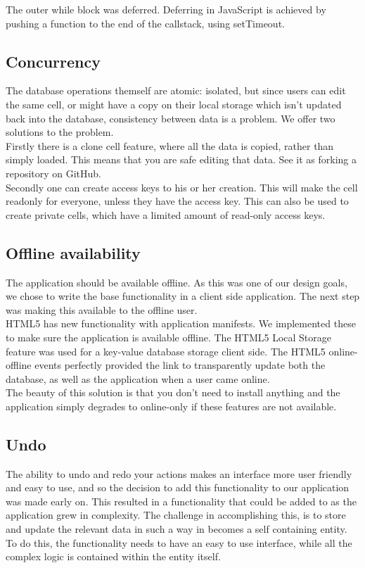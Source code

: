 \documentclass[10pt,a4paper]{report}
\begin{document}
			The outer while block was deferred. Deferring in JavaScript is achieved by pushing a function to the end of the callstack, using setTimeout.
		
		\subsection{Concurrency}
			The database operations themself are atomic: isolated, but since users can edit the same cell, or might have a copy on their local storage which isn't updated back into the database, consistency between data is a problem. We offer two solutions to the problem.\\ 
			
			Firstly there is a clone cell feature, where all the data is copied, rather than simply loaded. This means that you are safe editing that data. See it as forking a repository on GitHub.\\
			
			Secondly one can create access keys to his or her creation. This will make the cell readonly for everyone, unless they have the access key. This can also be used to create private cells, which have a limited amount of read-only access keys.
		
		\subsection{Offline availability}
			The application should be available offline. As this was one of our design goals, we chose to write the base functionality in a client side application. The next step was making this available to the offline user.\\
			HTML5 has new functionality with application manifests. We implemented these to make sure the application is available offline. The HTML5 Local Storage feature was used for a key-value database storage client side. The HTML5 online-offline events perfectly provided the link to transparently update both the database, as well as the application when a user came online.\\
			The beauty of this solution is that you don't need to install anything and the application simply degrades to online-only if these features are not available.
		
		\subsection{Undo}
			The ability to undo and redo your actions makes an interface more user friendly and easy to use, and so the decision to add this functionality to our application was made early on. This resulted in a functionality that could be added to as the application grew in complexity. The challenge in accomplishing this, is to store and update the relevant data in such a way in becomes a self containing entity. To do this, the functionality needs to have an easy to use interface, while all the complex logic is contained within the entity itself.
			
\end{document}
